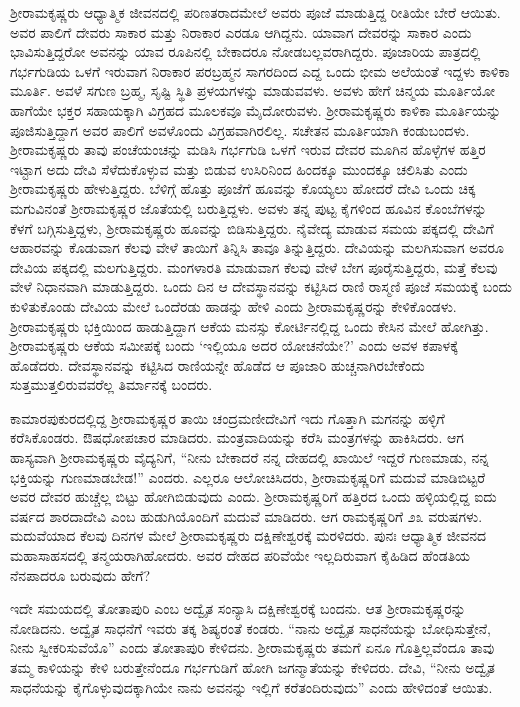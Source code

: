 ಶ‍್ರೀರಾಮಕೃಷ್ಣರು ಆಧ್ಯಾತ್ಮಿಕ ಜೀವನದಲ್ಲಿ ಪರಿಣತರಾದಮೇಲೆ ಅವರು ಪೂಜೆ ಮಾಡುತ್ತಿದ್ದ ರೀತಿಯೇ ಬೇರೆ ಆಯಿತು. ಅವರ ಪಾಲಿಗೆ ದೇವರು ಸಾಕಾರ ಮತ್ತು ನಿರಾಕಾರ ಎರಡೂ ಆಗಿದ್ದನು. ಯಾವಾಗ ದೇವರನ್ನು ಸಾಕಾರ ಎಂದು ಭಾವಿಸುತ್ತಿದ್ದರೋ ಅವನನ್ನು ಯಾವ ರೂಪಿನಲ್ಲಿ ಬೇಕಾದರೂ ನೋಡಬಲ್ಲವರಾಗಿದ್ದರು. ಪೂಜಾರಿಯ ಪಾತ್ರದಲ್ಲಿ ಗರ್ಭಗುಡಿಯ ಒಳಗೆ ಇರುವಾಗ ನಿರಾಕಾರ ಪರಬ್ರಹ್ಮನ ಸಾಗರದಿಂದ ಎದ್ದ ಒಂದು ಭೀಮ ಅಲೆಯಂತೆ ಇದ್ದಳು ಕಾಳಿಕಾ ಮೂರ್ತಿ. ಅವಳೆ ಸಗುಣ ಬ್ರಹ್ಮ, ಸೃಷ್ಟಿ ಸ್ಥಿತಿ ಪ್ರಳಯಗಳನ್ನು ಮಾಡುವವಳು. ಅವಳು ಹೇಗೆ ಚಿನ್ಮಯ ಮೂರ್ತಿಯೋ ಹಾಗೆಯೇ ಭಕ್ತರ ಸಹಾಯಕ್ಕಾಗಿ ವಿಗ್ರಹದ ಮೂಲಕವೂ ಮೈದೋರುವಳು. ಶ‍್ರೀರಾಮಕೃಷ್ಣರು ಕಾಳಿಕಾ ಮೂರ್ತಿಯನ್ನು ಪೂಜಿಸುತ್ತಿದ್ದಾಗ ಅವರ ಪಾಲಿಗೆ ಅವಳೊಂದು ವಿಗ್ರಹವಾಗಿರಲಿಲ್ಲ. ಸಚೇತನ ಮೂರ್ತಿಯಾಗಿ ಕಂಡುಬಂದಳು. ಶ‍್ರೀರಾಮಕೃಷ್ಣರು ತಾವು ಪಂಚೆಯಂಚನ್ನು ಮಡಿಸಿ ಗರ್ಭಗುಡಿ ಒಳಗೆ ಇರುವ ದೇವರ ಮೂಗಿನ ಹೊಳ್ಳೆಗಳ ಹತ್ತಿರ ಇಟ್ಟಾಗ ಅದು ದೇವಿ ಸೆಳೆದುಕೊಳ್ಳುವ ಮತ್ತು ಬಿಡುವ ಉಸಿರಿನಿಂದ ಹಿಂದಕ್ಕೂ ಮುಂದಕ್ಕೂ ಚಲಿಸಿತು ಎಂದು ಶ‍್ರೀರಾಮಕೃಷ್ಣರು ಹೇಳುತ್ತಿದ್ದರು. ಬೆಳಿಗ್ಗೆ ಹೊತ್ತು ಪೂಜೆಗೆ ಹೂವನ್ನು ಕೊಯ್ಯಲು ಹೋದರೆ ದೇವಿ ಒಂದು ಚಿಕ್ಕ ಮಗುವಿನಂತೆ ಶ‍್ರೀರಾಮಕೃಷ್ಣರ ಜೊತೆಯಲ್ಲಿ ಬರುತ್ತಿದ್ದಳು. ಅವಳು ತನ್ನ ಪುಟ್ಟ ಕೈಗಳಿಂದ ಹೂವಿನ ಕೊಂಬೆಗಳನ್ನು ಕೆಳಗೆ ಬಗ್ಗಿಸುತ್ತಿದ್ದಳು, ಶ‍್ರೀರಾಮಕೃಷ್ಣರು ಹೂವನ್ನು ಬಿಡಿಸುತ್ತಿದ್ದರು. ನೈವೇದ್ಯ ಮಾಡುವ ಸಮಯ ಪಕ್ಕದಲ್ಲಿ ದೇವಿಗೆ ಆಹಾರವನ್ನು ಕೊಡುವಾಗ ಕೆಲವು ವೇಳೆ ತಾಯಿಗೆ ತಿನ್ನಿಸಿ ತಾವೂ ತಿನ್ನುತ್ತಿದ್ದರು. ದೇವಿಯನ್ನು ಮಲಗಿಸುವಾಗ ಅವರೂ ದೇವಿಯ ಪಕ್ಕದಲ್ಲಿ ಮಲಗುತ್ತಿದ್ದರು. ಮಂಗಳಾರತಿ ಮಾಡುವಾಗ ಕೆಲವು ವೇಳೆ ಬೇಗ ಪೂರೈಸುತ್ತಿದ್ದರು, ಮತ್ತೆ ಕೆಲವು ವೇಳೆ ನಿಧಾನವಾಗಿ ಮಾಡುತ್ತಿದ್ದರು. ಒಂದು ದಿನ ಆ ದೇವಸ್ಥಾನವನ್ನು ಕಟ್ಟಿಸಿದ ರಾಣಿ ರಾಸ್ಮಣಿ ಪೂಜೆ ಸಮಯಕ್ಕೆ ಬಂದು ಕುಳಿತುಕೊಂಡು ದೇವಿಯ ಮೇಲೆ ಒಂದೆರಡು ಹಾಡನ್ನು ಹೇಳಿ ಎಂದು ಶ‍್ರೀರಾಮಕೃಷ್ಣರನ್ನು ಕೇಳಿಕೊಂಡಳು. ಶ‍್ರೀರಾಮಕೃಷ್ಣರು ಭಕ್ತಿಯಿಂದ ಹಾಡುತ್ತಿದ್ದಾಗ ಆಕೆಯ ಮನಸ್ಸು ಕೋರ್ಟಿನಲ್ಲಿದ್ದ ಒಂದು ಕೇಸಿನ ಮೇಲೆ ಹೋಗಿತ್ತು. ಶ‍್ರೀರಾಮಕೃಷ್ಣರು ಆಕೆಯ ಸಮೀಪಕ್ಕೆ ಬಂದು ‘ಇಲ್ಲಿಯೂ ಅದರ ಯೋಚನೆಯೇ?’ ಎಂದು ಅವಳ ಕಪಾಳಕ್ಕೆ ಹೊಡೆದರು. ದೇವಸ್ಥಾನವನ್ನು ಕಟ್ಟಿಸಿದ ರಾಣಿಯನ್ನೇ ಹೊಡೆದ ಆ ಪೂಜಾರಿ ಹುಚ್ಚನಾಗಿರಬೇಕೆಂದು ಸುತ್ತಮುತ್ತಲಿರುವವರೆಲ್ಲ ತಿರ್ಮಾನಕ್ಕೆ ಬಂದರು.

ಕಾಮಾರಪುಕುರದಲ್ಲಿದ್ದ ಶ‍್ರೀರಾಮಕೃಷ್ಣರ ತಾಯಿ ಚಂದ್ರಮಣೀದೇವಿಗೆ ಇದು ಗೊತ್ತಾಗಿ ಮಗನನ್ನು ಹಳ್ಳಿಗೆ ಕರೆಸಿಕೊಂಡರು. ಔಷಧೋಪಚಾರ ಮಾಡಿದರು. ಮಂತ್ರವಾದಿಯನ್ನು ಕರೆಸಿ ಮಂತ್ರಗಳನ್ನು ಹಾಕಿಸಿದರು. ಆಗ ಹಾಸ್ಯವಾಗಿ ಶ‍್ರೀರಾಮಕೃಷ್ಣರು ವೈದ್ಯನಿಗೆ, “ನೀನು ಬೇಕಾದರೆ ನನ್ನ ದೇಹದಲ್ಲಿ ಖಾಯಿಲೆ ಇದ್ದರೆ ಗುಣಮಾಡು, ನನ್ನ ಭಕ್ತಿಯನ್ನು ಗುಣಮಾಡಬೇಡ!” ಎಂದರು. ಎಲ್ಲರೂ ಆಲೋಚಿಸಿದರು, ಶ‍್ರೀರಾಮಕೃಷ್ಣರಿಗೆ ಮದುವೆ ಮಾಡಿಬಿಟ್ಟರೆ ಅವರ ದೇವರ ಹುಚ್ಚೆಲ್ಲ ಬಿಟ್ಟು ಹೋಗಿಬಿಡುವುದು ಎಂದು. ಶ‍್ರೀರಾಮಕೃಷ್ಣರಿಗೆ ಹತ್ತಿರದ ಒಂದು ಹಳ್ಳಿಯಲ್ಲಿದ್ದ ಐದು ವರ್ಷದ ಶಾರದಾದೇವಿ ಎಂಬ ಹುಡುಗಿಯೊಂದಿಗೆ ಮದುವೆ ಮಾಡಿದರು. ಆಗ ರಾಮಕೃಷ್ಣರಿಗೆ ೨೩ ವರುಷಗಳು. ಮದುವೆಯಾದ ಕೆಲವು ದಿನಗಳ ಮೇಲೆ ಶ‍್ರೀರಾಮಕೃಷ್ಣರು ದಕ್ಷಿಣೇಶ್ವರಕ್ಕೆ ಮರಳಿದರು. ಪುನಃ ಆಧ್ಯಾತ್ಮಿಕ ಜೀವನದ ಮಹಾಸಾಹಸದಲ್ಲಿ ತನ್ಮಯರಾಗಿಹೋದರು. ಅವರ ದೇಹದ ಪರಿವೆಯೇ ಇಲ್ಲದಿರುವಾಗ ಕೈಹಿಡಿದ ಹೆಂಡತಿಯ ನೆನಪಾದರೂ ಬರುವುದು ಹೇಗೆ?

ಇದೇ ಸಮಯದಲ್ಲಿ ತೋತಾಪುರಿ ಎಂಬ ಅದ್ವೈತ ಸಂನ್ಯಾಸಿ ದಕ್ಷಿಣೇಶ್ವರಕ್ಕೆ ಬಂದನು. ಆತ ಶ‍್ರೀರಾಮಕೃಷ್ಣರನ್ನು ನೋಡಿದನು. ಅದ್ವೈತ ಸಾಧನೆಗೆ ಇವರು ತಕ್ಕ ಶಿಷ್ಯರಂತೆ ಕಂಡರು. “ನಾನು ಅದ್ವೈತ ಸಾಧನೆಯನ್ನು ಬೋಧಿಸುತ್ತೇನೆ, ನೀನು ಸ್ವೀಕರಿಸುವೆಯೊ” ಎಂದು ತೋತಾಪುರಿ ಕೇಳಿದನು. ಶ‍್ರೀರಾಮಕೃಷ್ಣರು ತಮಗೆ ಏನೂ ಗೊತ್ತಿಲ್ಲವೆಂದೂ ತಾವು ತಮ್ಮ ಕಾಳಿಯನ್ನು ಕೇಳಿ ಬರುತ್ತೇನೆಂದೂ ಗರ್ಭಗುಡಿಗೆ ಹೋಗಿ ಜಗನ್ಮಾತೆಯನ್ನು ಕೇಳಿದರು. ದೇವಿ, “ನೀನು ಅದ್ವೈತ ಸಾಧನೆಯನ್ನು ಕೈಗೊಳ್ಳುವುದಕ್ಕಾಗಿಯೇ ನಾನು ಅವನನ್ನು ಇಲ್ಲಿಗೆ ಕರೆತಂದಿರುವುದು” ಎಂದು ಹೇಳಿದಂತೆ ಆಯಿತು.

